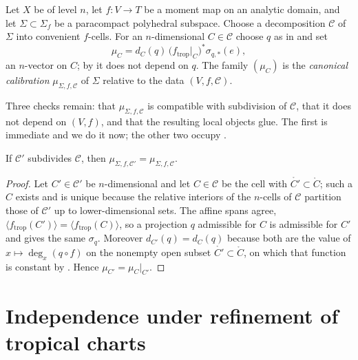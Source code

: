 \begin{definition}
\label{def:trop-canonical-calibration}
Let $X$ be of level $n$, let $f:V\to T$ be a moment map on an analytic
domain, and let $\Sigma\subset\Sigma_f$ be a paracompact polyhedral
subspace. Choose a decomposition $\mathscr C$ of $\Sigma$ into convenient
$f$-cells. For an $n$-dimensional $C\in\mathscr C$ choose $q$ as in
 and set
\begin{equation}
\label{eq:trop-canonical-calibration}
 \mu_C=d_C(q)\,\bigl(f_{\mathrm{trop}}|_C\bigr)^*\sigma_{q,*}(e),
\end{equation}
an $n$-vector on $C$; by  it does not
depend on $q$. The family $(\mu_C)$ is the \emph{canonical calibration}
$\mu_{\Sigma,f,\mathscr C}$ of $\Sigma$ relative to the data
$(V,f,\mathscr C)$.
\end{definition}

Three checks remain: that $\mu_{\Sigma,f,\mathscr C}$ is compatible with
subdivision of $\mathscr C$, that it does not depend on $(V,f)$, and that
the resulting local objects glue. The first is immediate and we do it now;
the other two occupy .

\begin{lemma}
\label{lem:trop-calibration-subdivision}
If $\mathscr C'$ subdivides $\mathscr C$, then
$\mu_{\Sigma,f,\mathscr C'}=\mu_{\Sigma,f,\mathscr C}$.
\end{lemma}

\begin{proof}
Let $C'\in\mathscr C'$ be $n$-dimensional and let $C\in\mathscr C$ be the
cell with $\mathring{C'}\subset\mathring C$; such a $C$ exists and is unique
because the relative interiors of the $n$-cells of $\mathscr C$ partition
those of $\mathscr C'$ up to lower-dimensional sets. The affine spans agree,
$\langle f_{\mathrm{trop}}(C')\rangle=\langle f_{\mathrm{trop}}(C)\rangle$,
so a projection $q$ admissible for $C$ is admissible for $C'$ and gives the
same $\sigma_q$. Moreover $d_{C'}(q)=d_C(q)$ because both are the value of
$x\mapsto\deg_x(q\circ f)$ on the nonempty open subset
$\mathring{C'}\subset\mathring C$, on which that function is constant by
. Hence $\mu_{C'}=\mu_C|_{C'}$.
\end{proof}

\section{Independence under refinement of tropical charts}
\label{sec:trop-refinement}

